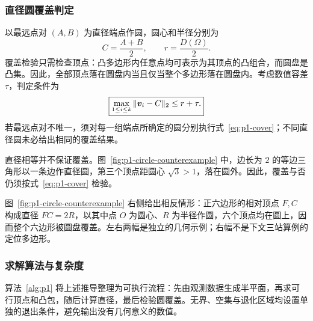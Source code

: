 \subsubsection{直径圆覆盖判定}

以最远点对 \((A,B)\) 为直径端点作圆，圆心和半径分别为
\begin{equation}
  C=\frac{A+B}{2},\qquad r=\frac{D(\Omega)}{2}.
  \label{eq:p1-circle}
\end{equation}
覆盖检验只需检查顶点：凸多边形内任意点均可表示为其顶点的凸组合，而圆盘是凸集。因此，全部顶点落在圆盘内当且仅当整个多边形落在圆盘内。考虑数值容差 \(\tau\)，判定条件为
\begin{equation}
  \boxed{\max_{1\le i\le k}\|\bm{v}_i-C\|_2\le r+\tau.}
  \label{eq:p1-cover}
\end{equation}
若最远点对不唯一，须对每一组端点所确定的圆分别执行式~\eqref{eq:p1-cover}；不同直径圆未必给出相同的覆盖结果。

直径相等并不保证覆盖。图~\ref{fig:p1-circle-counterexample} 中，边长为 \(2\) 的等边三角形以一条边作直径圆，第三个顶点距圆心 \(\sqrt3>1\)，落在圆外。因此，覆盖与否仍须按式~\eqref{eq:p1-cover} 检验。


图~\ref{fig:p1-circle-counterexample} 右侧给出相反情形：正六边形的相对顶点 \(F,C\) 构成直径 \(FC=2R\)，以其中点 \(O\) 为圆心、\(R\) 为半径作圆，六个顶点均在圆上，因而整个六边形被圆盘覆盖。左右两幅是独立的几何示例；右幅不是下文三站算例的定位多边形。

\subsubsection{求解算法与复杂度}

算法~\ref{alg:p1} 将上述推导整理为可执行流程：先由观测数据生成半平面，再求可行顶点和凸包，随后计算直径，最后检验圆覆盖。无界、空集与退化区域均设置单独的退出条件，避免输出没有几何意义的数值。

